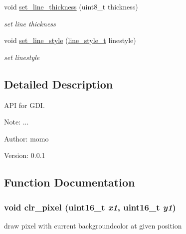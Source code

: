 \begin{CompactItemize}
void \hyperlink{group__hgdi__api_g4e1ad4c71558a1855664187428409bba}{set\_\-line\_\-thickness} (uint8\_\-t thickness)
\begin{CompactList}\small\item\em set line thickness \item\end{CompactList}\item 
void \hyperlink{group__hgdi__api_gb9b7e1a4efa87c1d2a8e6b34d49a3aeb}{set\_\-line\_\-style} (\hyperlink{group__hgdi__types_gdfccdb9380d340f00e646a1fd04b79d9}{line\_\-style\_\-t} linestyle)
\begin{CompactList}\small\item\em set linestyle \item\end{CompactList}\end{CompactItemize}


\subsection{Detailed Description}
API for GDI. 

\begin{Desc}
\item[Note:]... \end{Desc}
\begin{Desc}
\item[Author:]momo \end{Desc}
\begin{Desc}
\item[Version:]0.0.1 \end{Desc}


\subsection{Function Documentation}
\hypertarget{group__hgdi__api_g7f1f418ba1d392e2f8f2ea2bf346c2c0}{
\subsubsection[{clr\_\-pixel}]{\setlength{\rightskip}{0pt plus 5cm}void clr\_\-pixel (uint16\_\-t {\em x1}, \/  uint16\_\-t {\em y1})}}
\label{group__hgdi__api_g7f1f418ba1d392e2f8f2ea2bf346c2c0}


draw pixel with current backgroundcolor at given position 

